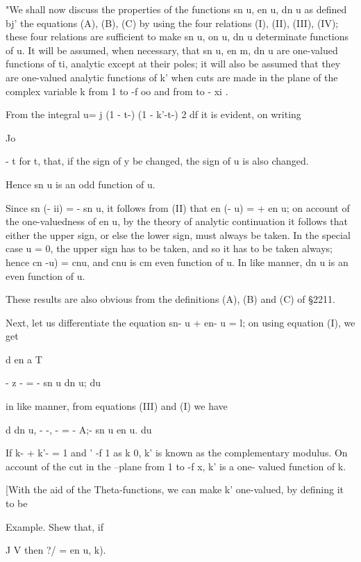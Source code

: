 "We shall now discuss the properties of the functions sn u, en u, dn u
as defined bj' the equations (A), (B), (C) by using the four relations
(I), (II), (III), (IV); these four relations are sufficient to make
sn u, on u, dn u determinate functions of u. It will be assumed, when
necessary, that sn u, en m, dn u are one-valued functions of ti,
analytic except at their poles; it will also be assumed that they are
one-valued analytic functions of k' when cuts are made in the plane of
the complex variable k from 1 to -f oo and from to - xi .


From the integral u= j (1 - t-) (1 - k'-t-) 2 df it is evident, on
writing

Jo

- t for t, that, if the sign of y be changed, the sign of u is also
changed.

Hence sn u is an odd function of u.

Since sn (- ii) = - sn u, it follows from (II) that en (- u) = + en u;
on account of the one-valuedness of en u, by the theory of analytic
continuation it follows that either the upper sign, or else the lower
sign, must always be taken. In the special case u = 0, the upper sign
has to be taken, and so it has to be taken always; hence cn -u) = cnu,
and cnu is cm even function of u. In like manner, dn u is an even
function of u.

These results are also obvious from the definitions (A), (B) and (C)
of §2211.

Next, let us differentiate the equation sn- u + en- u = l; on using
equation (I), we get

d en a T

- z - = - sn u dn u; du

in like manner, from equations (III) and (I) we have

d dn u, - -, - = - A;- sn u en u. du


If k- + k'- = 1 and ' -f 1 as k 0, k' is known as the complementary
modulus. On account of the cut in the --plane from 1 to -f x, k' is a
one- valued function of k.

[With the aid of the Theta-functions, we can make k' one-valued, by
defining it to be

Example. Shew that, if

J V then ?/ = en u, k).

